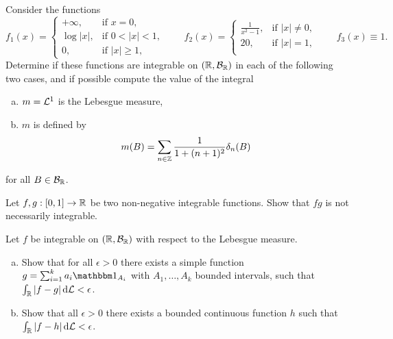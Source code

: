 \begin{problem}Consider the functions
    \begin{equation*}
        f_1(x) = \begin{cases}
            +\infty, & \text{if } x=0,\\
            \log|x|, & \text{if } 0<|x|<1,\\
            0, & \text{if }|x|\geq 1,
        \end{cases}
        \qquad 
        f_2(x) = \begin{cases}
            \frac{1}{x^2-1}, & \text{if } |x|\neq 0,\\
            20, & \text{if } |x| = 1,\\
        \end{cases}
        \qquad f_3(x)\equiv 1.
    \end{equation*}
    Determine if these functions are integrable on $(\mathbb R,\mathcal B_{\mathbb R})$ in each of the following two cases, and if possible compute the value of the integral
    \begin{enumerate}[a)]
        \item $m =\mathcal L^1$ is the Lebesgue measure,
        \item $m$ is defined by
        \begin{equation*}
            m(B) = \sum_{n\in \mathbb Z} \frac{1}{1+(n+1)^2} \delta_n(B)
        \end{equation*}
    \end{enumerate}
    for all $B\in \mathcal B_{\mathbb R}$.
\end{problem}

\begin{problem} Let $f,g: [0,1]\to\mathbb R$ be two non-negative integrable functions. Show that $fg$ is not necessarily integrable.
\end{problem}

\begin{problem} Let $f$ be integrable on $(\mathbb R,\mathcal B_{\mathbb R})$ with respect to the Lebesgue measure. 
    \begin{enumerate}[a)]
        \item Show that for all $\epsilon>0$ there exists a simple function $g = \sum_{i=1}^k a_i \indE{A_i}$ with $A_1,\ldots, A_k$ bounded intervals, such that $\int_{\mathbb R} |f-g|\,\mathrm{d} \mathcal L<\epsilon$.
        \item Show that all $\epsilon>0$ there exists a bounded continuous function $h$ such that $\int_{\mathbb R} |f-h|\,\mathrm{d} \mathcal L<\epsilon$.
    \end{enumerate}
\end{problem}

